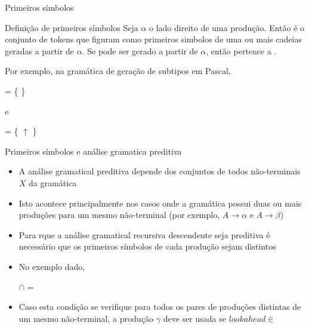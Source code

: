 \begin{frame}[fragile]{Primeiros símbolos}

    \begin{block}{Definição de primeiros símbolos}
        Seja $\alpha$ o lado direito de uma produção. Então  é o conjunto de tokens que figuram como primeiros simbolos de uma ou mais
        cadeias geradas a partir de $\alpha$. Se  pode ser gerado a partir de $\alpha$, então  pertence a .
    \end{block}

    \vspace{0.2in}
    Por exemplo, na gramática de geração de subtipos em Pascal, 

    \begin{center} = \{  \}\end{center}

    e

    \begin{center} = \{ $\uparrow$ \}\end{center}
    
\end{frame}

\begin{frame}[fragile]{Primeiros símbolos e análise gramatica preditiva}

    \begin{itemize}
        \item A análise gramatical preditiva depende dos conjuntos  de todos não-terminais $X$ da gramática
        \pause

        \item Isto acontece principalmente nos casos onde a gramática possui duas ou mais produções para um mesmo não-terminal (por exemplo, $A \to \alpha$ e 
        $A\to \beta$)
        \pause

        \item Para rque a análise gramatical recursiva descendente seja preditiva é necessário que os primeiros símbolos de cada produção sejam distintos
        \pause

        \item No exemplo dado,

        \begin{center}
         $\cap$  = \emptyset
        \end{center}
        \pause

        \item Caso esta condição se verifique para todos os pares de produções distintas de um mesmo não-terminal, a produção $\gamma$ deve ser usada se
        $lookahead \in$ 
    \end{itemize}

\end{frame}

